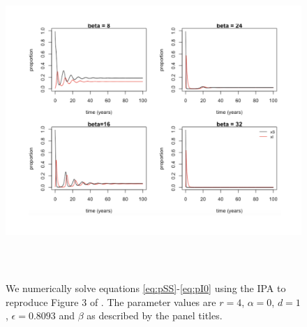 \documentclass[11pt, oneside]{article}   	%
\begin{document}
\begin{figure}[!ht] 
\includegraphics[height=12cm]{sato3} 
\caption[]{We numerically solve equations \ref{eq:pSS}-\ref{eq:pI0} using the IPA to reproduce Figure 3 of \cite{sato}. The parameter values are $r=4$, $\alpha = 0$, $d=1$, $\epsilon = 0.8093$ and $\beta$ as described by the panel titles.} \label{fig:sato}
\end{figure}
\end{document}
